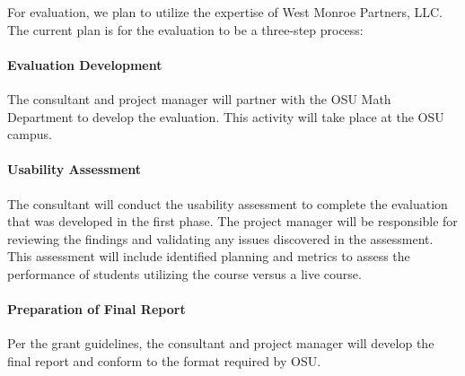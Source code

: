 For evaluation, we plan to utilize the expertise of West Monroe
Partners, LLC. The current plan is for the evaluation to be a three-step process:
\paragraph{Evaluation Development} The consultant and project
  manager will partner with the OSU Math Department to develop the
  evaluation.  This activity will take place at the OSU campus.
\paragraph{Usability Assessment} The consultant will conduct the usability
  assessment to complete the evaluation that was developed in the
  first phase.  The project manager will be responsible for reviewing
  the findings and validating any issues discovered in the assessment.
  This assessment will include identified planning and metrics to
  assess the performance of students utilizing the course versus a
  live course.
\paragraph{Preparation of Final Report} Per the grant guidelines, the
  consultant and project manager will develop the final report and
  conform to the format required by OSU.

